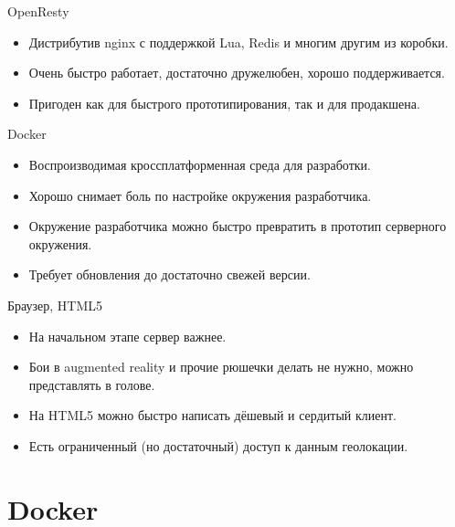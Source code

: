 \documentclass[aspectratio=169,handout,bigger]{beamer}
\begin{document}
\begin{frame}{OpenResty}
  \begin{itemize}
    \item Дистрибутив nginx с поддержкой Lua, Redis и многим другим из коробки.
    \item Очень быстро работает, достаточно дружелюбен, хорошо поддерживается.
    \item Пригоден как для быстрого прототипирования, так и для продакшена.
  \end{itemize}
\end{frame}


\begin{frame}{Docker}
  \begin{itemize}
    \item Воспроизводимая кроссплатформенная среда для разработки.
    \item Хорошо снимает боль по настройке окружения разработчика.
    \item Окружение разработчика можно быстро превратить в прототип серверного окружения.
    \item Требует обновления до достаточно свежей версии.
  \end{itemize}
\end{frame}


\begin{frame}{Браузер, HTML5}
  \begin{itemize}
    \item На начальном этапе сервер важнее.
    \item Бои в augmented reality и прочие рюшечки делать не нужно,
          можно представлять в голове.
    \item На HTML5 можно быстро написать дёшевый и сердитый клиент.
    \item Есть ограниченный (но достаточный) доступ к данным геолокации.
  \end{itemize}
\end{frame}


\section{Docker}
\end{document}
